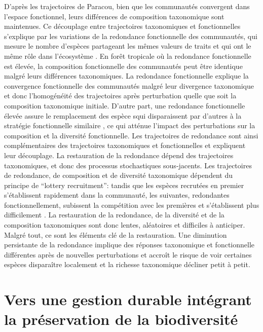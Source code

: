 \documentclass[
  11pt,
  french,
  A4paper,
  extrafontsizes,onecolumn,openright
  ]{memoir}
\begin{document}
D'après les trajectoires de Paracou, bien que les communautés convergent
dans l'espace fonctionnel, leurs différences de composition taxonomique
sont maintenues. Ce découplage entre trajectoires taxonomiques et
fonctionnelles s'explique par les variations de la redondance
fonctionnelle des communautés, qui mesure le nombre d'espèces partageant
les mêmes valeurs de traits et qui ont le même rôle dans l'écosystème
\autocite{Bellwood2006}. En forêt tropicale où la redondance
fonctionnelle est élevée, la composition fonctionnelle des communautés
peut être identique malgré leurs différences taxonomiques. La redondance
fonctionnelle explique la convergence fonctionnelle des communautés
malgré leur divergence taxonomique et donc l'homogénéité des
trajectoires après perturbation quelle que soit la composition
taxonomique initiale. D'autre part, une redondance fonctionnelle élevée
assure le remplacement des espèce squi disparaissent par d'autres à la
stratégie fonctionnelle similaire \autocite{Carmona2016}, ce qui atténue
l'impact des perturbations sur la composition et la diversité
fonctionnelle. Les trajectoires de redondance sont ainsi complémentaires
des trajectoires taxonomiques et fonctionnelles et expliquent leur
découplage. La restauration de la redondance dépend des trajectoires
taxonomiques, et donc des processus stochastiques sous-jacents. Les
trajectoires de redondance, de composition et de diversité taxonomique
dépendent du principe de ``lottery recruitment'': tandis que les espèces
recrutées en premier s'établissent rapidement dans la communauté, les
suivantes, redondantes fonctionnellement, subissent la compétition avec
les premières et s'établissent plus difficilement \autocite{Busing2002}.
La restauration de la redondance, de la diversité et de la composition
taxonomiques sont donc lentes, aléatoires et difficiles à anticiper.
Malgré tout, ce sont les éléments clé de la restauration. Une diminution
persistante de la redondance implique des réponses taxonomique et
fonctionnelle différentes après de nouvelles perturbations et accroît le
risque de voir certaines espèces disparaître localement et la richesse
taxonomique décliner petit à petit.

\section{Vers une gestion durable intégrant la préservation de la
biodiversité}\label{vers-une-gestion-durable-integrant-la-preservation-de-la-biodiversite}
\end{document}
